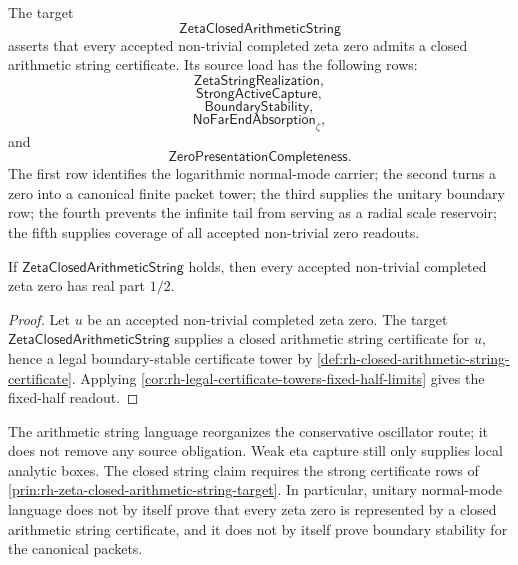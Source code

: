 \begin{principle}
\label{prin:rh-zeta-closed-arithmetic-string-target}
The target
$$
\mathsf{ZetaClosedArithmeticString}
$$
asserts that every accepted non-trivial completed zeta zero admits a
closed arithmetic string certificate. Its source load has the following
rows:
$$
\mathsf{ZetaStringRealization},
$$
$$
\mathsf{StrongActiveCapture},
$$
$$
\mathsf{BoundaryStability},
$$
$$
\mathsf{NoFarEndAbsorption}_{\zeta},
$$
and
$$
\mathsf{ZeroPresentationCompleteness}.
$$
The first row identifies the logarithmic normal-mode carrier; the second
turns a zero into a canonical finite packet tower; the third supplies the
unitary boundary row; the fourth prevents the infinite tail from serving
as a radial scale reservoir; the fifth supplies coverage of all accepted
non-trivial zero readouts.
\end{principle}

\begin{corollary}
\label{cor:rh-closed-arithmetic-string-coverage-fixed-half}
If $\mathsf{ZetaClosedArithmeticString}$ holds, then every accepted
non-trivial completed zeta zero has real part $1/2$.
\end{corollary}

\begin{proof}
Let $u$ be an accepted non-trivial completed zeta zero. The target
$\mathsf{ZetaClosedArithmeticString}$ supplies a closed arithmetic string
certificate for $u$, hence a legal boundary-stable certificate tower by
\autoref{def:rh-closed-arithmetic-string-certificate}. Applying
\autoref{cor:rh-legal-certificate-towers-fixed-half-limits} gives the
fixed-half readout.
\end{proof}

\begin{principle}
\label{prin:rh-string-language-proof-boundary}
The arithmetic string language reorganizes the conservative oscillator
route; it does not remove any source obligation. Weak eta capture still
only supplies local analytic boxes. The closed string claim requires the
strong certificate rows of
\autoref{prin:rh-zeta-closed-arithmetic-string-target}. In particular,
unitary normal-mode language does not by itself prove that every zeta
zero is represented by a closed arithmetic string certificate, and it
does not by itself prove boundary stability for the canonical packets.
\end{principle}

